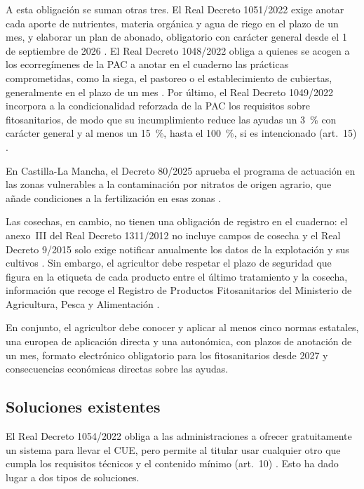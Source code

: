A esta obligación se suman otras tres. El Real Decreto 1051/2022 exige anotar cada aporte de nutrientes, materia orgánica y agua de riego en el plazo de un mes, y elaborar un plan de abonado, obligatorio con carácter general desde el 1 de septiembre de 2026 \citep{rd1051-2022}. El Real Decreto 1048/2022 obliga a quienes se acogen a los ecorregímenes de la PAC a anotar en el cuaderno las prácticas comprometidas, como la siega, el pastoreo o el establecimiento de cubiertas, generalmente en el plazo de un mes \citep{rd1048-2022}. Por último, el Real Decreto 1049/2022 incorpora a la condicionalidad reforzada de la PAC los requisitos sobre fitosanitarios, de modo que su incumplimiento reduce las ayudas un 3~\% con carácter general y al menos un 15~\%, hasta el 100~\%, si es intencionado (art.~15) \citep{rd1049-2022}.

En Castilla-La Mancha, el Decreto 80/2025 aprueba el programa de actuación en las zonas vulnerables a la contaminación por nitratos de origen agrario, que añade condiciones a la fertilización en esas zonas \citep{decreto80-2025clm}. 

Las cosechas, en cambio, no tienen una obligación de registro en el cuaderno: el anexo~III del Real Decreto 1311/2012 no incluye campos de cosecha y el Real Decreto 9/2015 solo exige notificar anualmente los datos de la explotación y sus cultivos \citep{rd1311-2012,rd9-2015}. Sin embargo, el agricultor debe respetar el plazo de seguridad que figura en la etiqueta de cada producto entre el último tratamiento y la cosecha, información que recoge el Registro de Productos Fitosanitarios del Ministerio de Agricultura, Pesca y Alimentación \citep{mapa-registro-fitosanitarios}.

En conjunto, el agricultor debe conocer y aplicar al menos cinco normas estatales, una europea de aplicación directa y una autonómica, con plazos de anotación de un mes, formato electrónico obligatorio para los fitosanitarios desde 2027 y consecuencias económicas directas sobre las ayudas.

\subsection{Soluciones existentes}\label{subsec:SolucionesExistentes}

El Real Decreto 1054/2022 obliga a las administraciones a ofrecer gratuitamente un sistema para llevar el CUE, pero permite al titular usar cualquier otro que cumpla los requisitos técnicos y el contenido mínimo (art.~10) \citep{rd1054-2022}. Esto ha dado lugar a dos tipos de soluciones.

